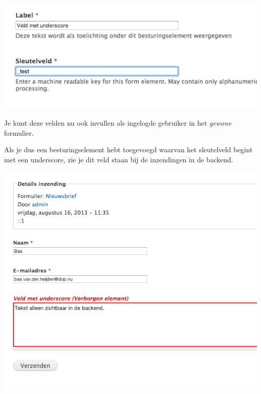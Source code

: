 \begin{center}
\includegraphics[width=\textwidth]{img/verborgenveld1.png}
\end{center}
Je kunt deze velden nu ook invullen als ingelogde gebruiker in het \emph{gewone} formulier.

Als je dus een besturingselement hebt toegevoegd waarvan het sleutelveld begint met een underscore, zie je dit veld staan bij de inzendingen in de backend.

\begin{center}
\includegraphics[width=\textwidth]{img/verborgenveld2.png}
\end{center}